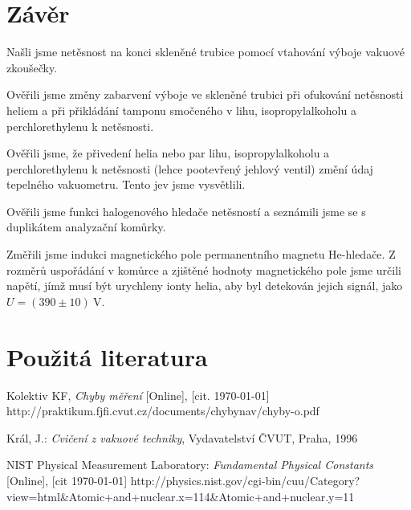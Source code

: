 \documentclass[english]{article}
\newcommand{\unit}[1]{~\mathrm{#1}}
\begin{document}
\section{Závěr}
	Našli jsme netěsnost na konci skleněné trubice pomocí vtahování výboje vakuové zkoušečky.
	
	Ověřili jsme změny zabarvení výboje ve skleněné trubici při ofukování netěsnosti heliem a při přikládání tamponu smočeného v lihu, isopropylalkoholu a perchlorethylenu k netěsnosti. 
	
	Ověřili jsme, že přivedení helia nebo par lihu, isopropylalkoholu a perchlorethylenu k netěsnosti (lehce pootevřený jehlový ventil) změní údaj tepelného vakuometru. Tento jev jsme vysvětlili.
	
	Ověřili jsme funkci halogenového hledače netěsností a seznámili jsme se s duplikátem analyzační komůrky.
	
	Změřili jsme indukci magnetického pole permanentního magnetu He-hledače. Z rozměrů uspořádání v komůrce a zjištěné hodnoty magnetického pole jsme určili napětí, jímž musí být urychleny ionty helia, aby byl detekován jejich signál, jako $U = (390\pm10)\unit{V}$.
	
\section {Použitá literatura}
\begingroup
\renewcommand{\section}[2]{}

\begin{thebibliography}{9}

 Kolektiv KF, \emph{Chyby měření} [Online], [cit. \today] \newline http://praktikum.fjfi.cvut.cz/documents/chybynav/chyby-o.pdf

Král, J.: \emph{Cvičení z vakuové techniky},
Vydavatelství ČVUT, Praha, 1996


NIST Physical Measurement Laboratory: \emph{Fundamental Physical Constants} [Online], [cit \today] \newline http://physics.nist.gov/cgi-bin/cuu/Category?view=html\&Atomic+and+nuclear.x=114\&Atomic+and+nuclear.y=11
 

\end{thebibliography}
\endgroup
\setcounter{equation}{0}
\end{document}
